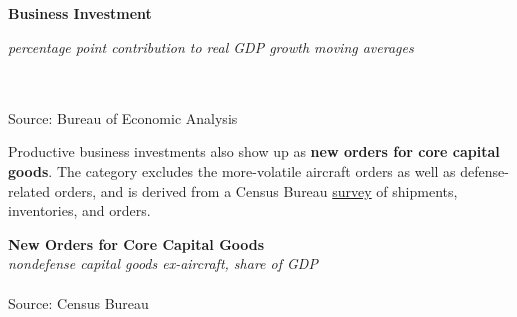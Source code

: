 \documentclass{report}
\newcommand{\tbllink}[1]{\href{https://raw.githubusercontent.com/bdecon/US-chartbook/master/chartbook/data/#1}{\faTable}}
\begin{document}
{{{{{\begin{minipage}{0.76\textwidth}
\vspace{3mm}

\small

 

\end{minipage}

\noindent \normalsize \textbf{Business Investment}\\
\footnotesize{\textit{percentage point contribution to real GDP growth \hspace{36mm} moving averages}\\ \vspace{4mm}
\noindent {} \setlength{\tabcolsep}{3.1pt} \color{black!90}
		{\renewcommand{\arraystretch}{1.55}
		 \begin{tabular}{p{42mm} R{6.7mm} R{6.7mm} R{6.7mm} R{6.7mm} R{6.7mm} 
		   R{7.8mm} R{6.7mm} R{6.7mm} }
			 \hline
		\end{tabular}
		}	\\
		
\vspace{-6mm}
\footnotesize{Source: Bureau of Economic Analysis}

\newpage

\begin{minipage}{0.34\textwidth}

\small Productive business investments also show up as \textbf{new orders for core capital goods}. The category excludes the more-volatile aircraft orders as well as defense-related orders, and is derived from a Census Bureau \href{https://www.census.gov/manufacturing/m3/index.html}{survey} of shipments, inventories, and orders.  \\


\end{minipage} \hspace{6mm}
\begin{minipage}{0.39\textwidth}

\noindent \normalsize \textbf{New Orders for Core Capital Goods}\\
\footnotesize{\textit{nondefense capital goods ex-aircraft, share of GDP}}\\
\noindent \hspace*{-2mm} \\
\footnotesize{Source: Census Bureau} \hspace{23mm} \tbllink{dgno.csv}
\end{minipage}\\

}}}}}}
\end{document}
